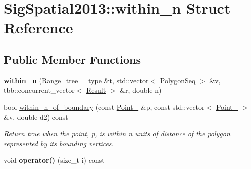 \hypertarget{structSigSpatial2013_1_1within__n}{\section{Sig\-Spatial2013\-:\-:within\-\_\-n Struct Reference}
\label{structSigSpatial2013_1_1within__n}
}
\subsection*{Public Member Functions}
\begin{DoxyCompactItemize}
\item 
\hypertarget{structSigSpatial2013_1_1within__n_ad11ca1ba7328173d83ffe4fb6264e6ef}{{\bfseries within\-\_\-n} (\hyperlink{namespaceSigSpatial2013_a1f24a632c09e5f10b138ef0096857e43}{Range\-\_\-tree\-\_\-\_\-type} \&t, std\-::vector$<$ \hyperlink{structSigSpatial2013_1_1PolygonSeq}{Polygon\-Seq} $>$ \&v, tbb\-::concurrent\-\_\-vector$<$ \hyperlink{namespaceSigSpatial2013_af3568b84c52aee7ab5aa8f15fb019d7f}{Result} $>$ \&r, double n)}\label{structSigSpatial2013_1_1within__n_ad11ca1ba7328173d83ffe4fb6264e6ef}

\item 
bool \hyperlink{structSigSpatial2013_1_1within__n_a9ddb1790f7e5549a46926caaf3d25ed0}{within\-\_\-n\-\_\-of\-\_\-boundary} (const \hyperlink{namespaceSigSpatial2013_a4d50a6d98aab2aa905654c8c2e3e3c58}{Point\-\_} \&p, const std\-::vector$<$ \hyperlink{namespaceSigSpatial2013_a4d50a6d98aab2aa905654c8c2e3e3c58}{Point\-\_} $>$ \&v, double d2) const 
\begin{DoxyCompactList}\small\item\em Return true when the point, p, is within n units of distance of the polygon represented by its bounding vertices. \end{DoxyCompactList}\item 
\hypertarget{structSigSpatial2013_1_1within__n_acdd3583e4b798bed14929fb40746d4a5}{void {\bfseries operator()} (size\-\_\-t i) const }\label{structSigSpatial2013_1_1within__n_acdd3583e4b798bed14929fb40746d4a5}

\end{DoxyCompactItemize}
